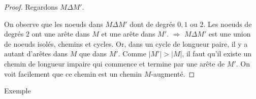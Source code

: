 \begin{mytheo} [Berge]
\begin{proof}
     Regardons $ M \Delta M'$. 
     
\begin{center}
\end{center}
     
     On observe que les noeuds dans $ M \Delta M'$ dont de degrés $0,1$ ou $2$. Les noeuds de degrés $2$ ont une arête dans $M$ et une arête dans $M'$. $\Rightarrow$ $ M \Delta M'$ est une union de noeuds isolés, chemins et cycles. Or, dans un cycle de longueur paire, il y a autant d'arêtes dans $M$ que dans $M'$. Comme  $ |M'| > |M| $, il faut qu'il existe un chemin de longueur impaire qui commence et termine par une arête de $M'$. On voit facilement que ce chemin est un chemin $M$-augmenté.

  \end{proof}
\end{mytheo}
\begin{myexem}
  Exemple \addTODO
\end{myexem}

